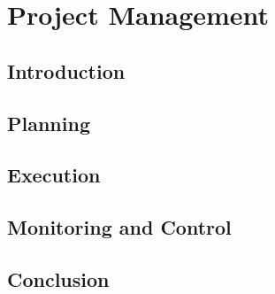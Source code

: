 \newpage
\chapter{Project Management}
\section{Introduction}
\lipsum[1]
\section{Planning}
\lipsum[2]
\section{Execution}
\lipsum[3]
\section{Monitoring and Control}
\lipsum[4]
\section{Conclusion}
\lipsum[5]